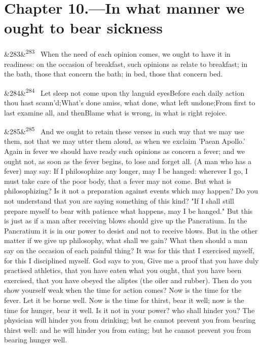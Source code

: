 \documentclass[12pt]{article}
\newcommand{\para}[1][]{\par\noindent\ifx&#1&\else\textsuperscript{\footnotesize #1}~\fi}
\begin{document}
\section*{Chapter 10.---In what manner we ought to bear sickness}

\para[283] When the need of each opinion comes, we ought to have it in readiness: on the occasion of breakfast, such opinions as relate to breakfast; in the bath, those that concern the bath; in bed, those that concern bed.

\para[284] Let sleep not come upon thy languid eyesBefore each daily action thou hast scann'd;What's done amiss, what done, what left undone;From first to last examine all, and thenBlame what is wrong, in what is right rejoice.

\para[285] And we ought to retain these verses in such way that we may use them, not that we may utter them aloud, as when we exclaim 'Paean Apollo.' Again in fever we should have ready such opinions as concern a fever; and we ought not, as soon as the fever begins, to lose and forget all. (A man who has a fever) may say: If I philosophize any longer, may I be hanged: wherever I go, I must take care of the poor body, that a fever may not come. But what is philosophizing? Is it not a preparation against events which may happen? Do you not understand that you are saying something of this kind? "If I shall still prepare myself to bear with patience what happens, may I be hanged." But this is just as if a man after receiving blows should give up the Pancratium. In the Pancratium it is in our power to desist and not to receive blows. But in the other matter if we give up philosophy, what shall we gain? What then should a man say on the occasion of each painful thing? It was for this that I exercised myself, for this I disciplined myself. God says to you, Give me a proof that you have duly practised athletics, that you have eaten what you ought, that you have been exercised, that you have obeyed the aliptes (the oiler and rubber). Then do you show yourself weak when the time for action comes? Now is the time for the fever. Let it be borne well. Now is the time for thirst, bear it well; now is the time for hunger, bear it well. Is it not in your power? who shall hinder you? The physician will hinder you from drinking; but he cannot prevent you from bearing thirst well: and he will hinder you from eating; but he cannot prevent you from bearing hunger well.
\end{document}
